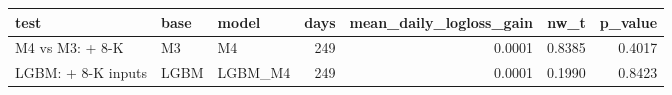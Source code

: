 \begin{tabular}{lllrrrr}
\toprule
test & base & model & days & mean\_daily\_logloss\_gain & nw\_t & p\_value \\
\midrule
M4 vs M3: + 8-K & M3 & M4 & 249 & 0.0001 & 0.8385 & 0.4017 \\
LGBM: + 8-K inputs & LGBM & LGBM\_M4 & 249 & 0.0001 & 0.1990 & 0.8423 \\
\bottomrule
\end{tabular}
